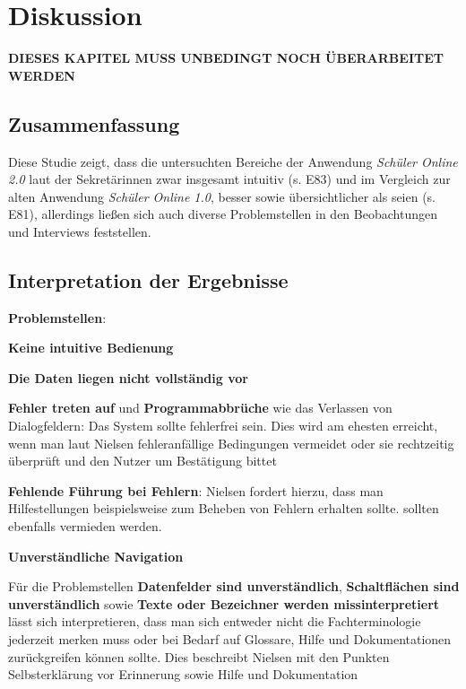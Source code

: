 \section{Diskussion}

\textbf{DIESES KAPITEL MUSS UNBEDINGT NOCH ÜBERARBEITET WERDEN}

\subsection{Zusammenfassung}
Diese Studie zeigt, dass die untersuchten Bereiche der Anwendung \textit{Schüler Online 2.0} laut der Sekretärinnen zwar insgesamt intuitiv (s. E83) und im Vergleich zur alten Anwendung \textit{Schüler Online 1.0}, \glqq besser\grqq{} sowie \glqq übersichtlicher \grqq{} als seien (s. E81), allerdings ließen sich auch diverse Problemstellen in den Beobachtungen und Interviews feststellen. 

%

\subsection{Interpretation der Ergebnisse}

\textbf{Problemstellen}:

\textbf{Keine intuitive Bedienung}

\textbf{Die Daten liegen nicht vollständig vor}

\textbf{Fehler treten auf} und \textbf{Programmabbrüche} wie das Verlassen von Dialogfeldern: Das System sollte fehlerfrei sein. Dies wird am ehesten erreicht, wenn man laut Nielsen fehleranfällige Bedingungen  vermeidet oder sie rechtzeitig überprüft und den Nutzer um Bestätigung bittet \cite{Nielsen10}

\textbf{Fehlende Führung bei Fehlern}: Nielsen fordert hierzu, dass man Hilfestellungen beispielsweise zum Beheben von Fehlern erhalten sollte.  \cite{Nielsen10}
sollten ebenfalls vermieden werden. 

\textbf{Unverständliche Navigation}

Für die Problemstellen \textbf{Datenfelder sind unverständlich}, \textbf{Schaltflächen sind unverständlich} sowie \textbf{Texte oder Bezeichner werden missinterpretiert} lässt sich interpretieren, dass man sich entweder nicht die Fachterminologie jederzeit merken muss oder bei Bedarf auf Glossare, Hilfe und Dokumentationen zurückgreifen können sollte. Dies beschreibt Nielsen mit den Punkten \glqq Selbsterklärung vor Erinnerung\grqq{} sowie \glqq Hilfe und Dokumentation\grqq{} \cite{Nielsen10}

